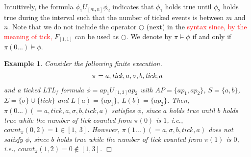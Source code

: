\documentclass[journal,twoside,web]{IEEEtran}
\newcommand{\qedwhite}{\hfill \ensuremath{\Box}}
\newtheorem{exa}{Example}
\newcommand{\red}[1]{\textcolor{red}{#1}}
\begin{document}
Intuitively, the formula $\phi_1 U_{[m,n]}  \phi_2$ indicates that $\phi_1$ holds true until $\phi_2$ holds true during the interval such that the number of ticked events is between $m$ and $n$. 
Note that we do not include the operator $\bigcirc$ (next) in the \red{syntax since, by the meaning of tick,} $F_{[1,1]}$ can be used as $\bigcirc$. 
We denote by $\pi \models \phi$ if and only if $\pi (0...) \models \phi$.

\begin{exa}
Consider the following finite execution.
\begin{align}
\pi=a,\textit{tick},a,\sigma,b,\textit{tick},a \notag
\end{align}
and a ticked LTL$_f$ formula $\phi=ap_1 U_{[1,3]} ap_2$ with $AP=\{ap_1,ap_2\}$, $S=\{a,b\}$, $\Sigma=\{\sigma\}\cup\{\textit{tick}\}$ and $L(a)=\{ap_1\},\ L(b)=\{ap_2\}$. Then, $\pi(0...) (= a,\textit{tick},a,\sigma,b,\textit{tick},a)$ satisfies $\phi$, since $a$ holds true until $b$ holds true while the number of \textit{tick} counted from $\pi(0)$ is $1$, i.e., $count_{\pi}(0, 2) = 1 \in[ 1,\ 3]$. However, $\pi (1...) (= a,\sigma,b,\textit{tick},a)$ does \textit{not} satisfy $\phi$, since $b$ holds true while the number of \textit{tick} counted from $\pi(1)$ is $0$, i.e., $count_{\pi}(1, 2) = 0 \notin [1, 3]$. \qedwhite 
\end{exa}




%
\end{document}

